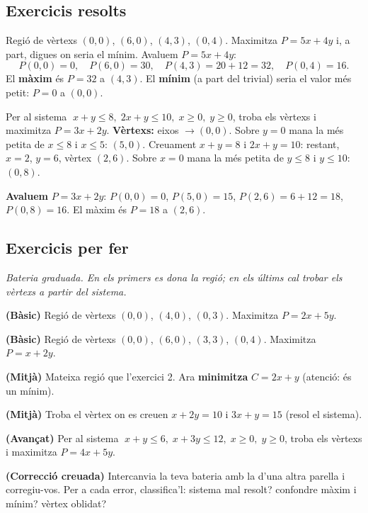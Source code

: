 \subsection{Exercicis resolts}

\begin{exresolt}
Regió de vèrtexs $(0,0)$, $(6,0)$, $(4,3)$, $(0,4)$. Maximitza $P=5x+4y$ i, a part,
digues on seria el mínim.
\solucio
Avaluem $P=5x+4y$:
\[
P(0,0)=0,\quad P(6,0)=30,\quad P(4,3)=20+12=32,\quad P(0,4)=16.
\]
El \textbf{màxim} és $P=32$ a $(4,3)$. El \textbf{mínim} (a part del trivial) seria el
valor més petit: $P=0$ a $(0,0)$.
\end{exresolt}

\begin{exresolt}
Per al sistema $\;x+y\le 8,\;2x+y\le 10,\;x\ge 0,\;y\ge 0$, troba els vèrtexs i
maximitza $P=3x+2y$.
\solucio
\textbf{Vèrtexs:} eixos $\rightarrow (0,0)$. Sobre $y=0$ mana la més petita de $x\le 8$
i $x\le 5$: $(5,0)$. Creuament $x+y=8$ i $2x+y=10$: restant, $x=2$, $y=6$, vèrtex
$(2,6)$. Sobre $x=0$ mana la més petita de $y\le 8$ i $y\le 10$: $(0,8)$.

\textbf{Avaluem} $P=3x+2y$: $P(0,0)=0$, $P(5,0)=15$, $P(2,6)=6+12=18$, $P(0,8)=16$.
El màxim és $P=18$ a $(2,6)$.
\end{exresolt}

\subsection{Exercicis per fer}

\noindent\textit{Bateria graduada. En els primers es dona la regió; en els últims cal
trobar els vèrtexs a partir del sistema.}

\begin{exercicis}
\begin{exlist}
  \item \textbf{(Bàsic)} Regió de vèrtexs $(0,0)$, $(4,0)$, $(0,3)$. Maximitza
        $P=2x+5y$.
  \item \textbf{(Bàsic)} Regió de vèrtexs $(0,0)$, $(6,0)$, $(3,3)$, $(0,4)$.
        Maximitza $P=x+2y$.
  \item \textbf{(Mitjà)} Mateixa regió que l'exercici 2. Ara \textbf{minimitza}
        $C=2x+y$ (atenció: és un mínim).
  \item \textbf{(Mitjà)} Troba el vèrtex on es creuen $x+2y=10$ i $3x+y=15$ (resol el
        sistema).
  \item \textbf{(Avançat)} Per al sistema $\;x+y\le 6,\;x+3y\le 12,\;x\ge 0,\;y\ge 0$,
        troba els vèrtexs i maximitza $P=4x+5y$.
  \item \textbf{(Correcció creuada)} Intercanvia la teva bateria amb la d'una altra
        parella i corregiu-vos. Per a cada error, classifica'l: sistema mal resolt?
        confondre màxim i mínim? vèrtex oblidat?
\end{exlist}
\end{exercicis}

